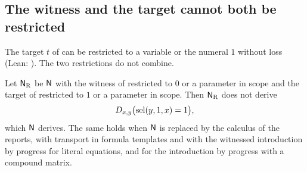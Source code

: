 \subsection{The witness and the target cannot both be restricted}

The target $t$ of  can be restricted to a variable or the
numeral $1$ without loss (Lean: ).  The two
restrictions do not combine.

\begin{theorem}
\label{wit:thm:finite-range}
Let $\mathsf{N}_{\mathrm R}$ be $\mathsf{N}$ with the witness of 
restricted to $0$ or a parameter in scope and the target of 
restricted to $1$ or a parameter in scope.  Then $\mathsf{N}_{\mathrm R}$ does not
derive
\[
 D_{x,y}\bigl(\operatorname{sel}(y,1,x)=1\bigr),
\]
which $\mathsf{N}$ derives.  The same holds when $\mathsf{N}$ is replaced by the
calculus of the reports, with transport in formula templates and with the
witnessed introduction by progress for literal equations, and for the
introduction by progress with a compound matrix.
\end{theorem}

